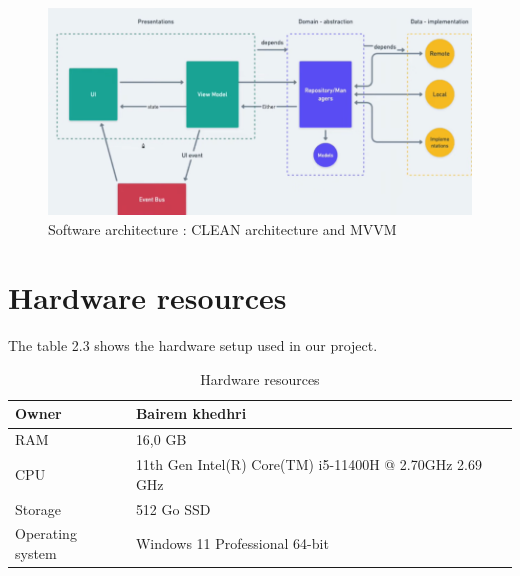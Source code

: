 \begin{figure}[H] 
            \centering
            \includegraphics[scale=0.8]{mvm.png}
            \caption{Software architecture : CLEAN architecture and MVVM } 
            \label{fig: CLEAN architecture and MVVM}
\end{figure}

\section{Hardware resources}
The table 2.3 shows the hardware setup used in our project.
\begin{table}[h]
    \centering
    \begin{tabular}{|p{4cm}|p{6cm}|}
        \hline
        Owner & Bairem khedhri\\
        \hline
        RAM & 16,0 GB \\
        \hline
        CPU & 11th Gen Intel(R) Core(TM) i5-11400H @ 2.70GHz   2.69 GHz \\
        \hline
        Storage & 512 Go SSD \\
        \hline
        Operating system  & Windows 11 Professional 64-bit \\
        \hline
    \end{tabular}
    \caption{Hardware resources}
    \label{Tab: Hardware resources}
\end{table}

